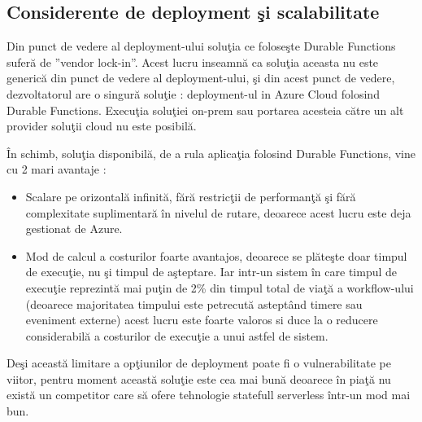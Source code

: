 \documentclass[a4paper,12pt]{report}
\begin{document}
\subsection{Considerente de deployment şi scalabilitate}
\quad Din punct de vedere al deployment-ului soluţia ce foloseşte Durable Functions suferă de ''vendor lock-in''. Acest lucru inseamnă ca soluţia aceasta nu este generică din punct de vedere al deployment-ului, şi din acest punct de vedere, dezvoltatorul are o singură soluţie : deployment-ul in Azure Cloud folosind Durable Functions. Execuţia soluţiei on-prem sau portarea acesteia către un alt provider soluţii cloud nu este posibilă. 
\par În schimb, soluţia disponibilă, de a rula aplicaţia folosind Durable Functions, vine cu 2 mari avantaje : 
\begin{itemize}
\item Scalare pe orizontală infinită, fără restricţii de performanţă şi fără complexitate suplimentară în nivelul de rutare, deoarece acest lucru este deja gestionat de Azure.
\item Mod de calcul a costurilor foarte avantajos, deoarece se plăteşte doar timpul de execuţie, nu şi timpul de aşteptare. Iar intr-un sistem în care timpul de execuţie reprezintă mai puţin de 2\% din timpul total de viaţă a workflow-ului (deoarece majoritatea timpului este petrecută asteptând timere sau eveniment externe) acest lucru este foarte valoros si duce la o reducere considerabilă a costurilor de execuţie a unui astfel de sistem. 
\end{itemize}
\par Deşi această limitare a opţiunilor de deployment poate fi o vulnerabilitate pe viitor, pentru moment această soluţie este cea mai bună deoarece în piaţă nu există un competitor care să ofere tehnologie statefull serverless într-un mod mai bun.  
\end{document}
